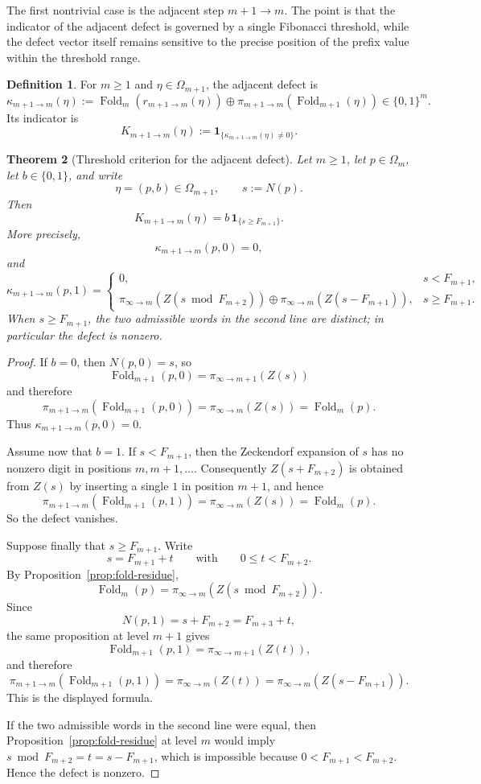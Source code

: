 \documentclass[11pt,reqno]{amsart}
\numberwithin{equation}{section}
\theoremstyle{plain}
\newtheorem{theorem}{Theorem}[section]
\theoremstyle{definition}
\newtheorem{definition}[theorem]{Definition}
\theoremstyle{remark}
\DeclareMathOperator{\Fold}{Fold}
\begin{document}
\noindent
The first nontrivial case is the adjacent step $m+1\to m$.  The point is that
the indicator of the adjacent defect is governed by a single Fibonacci
threshold, while the defect vector itself remains sensitive to the precise
position of the prefix value within the threshold range.

\begin{definition}
\label{def:adjacent-defect}
For $m\ge 1$ and $\eta\in\Omega_{m+1}$, the adjacent defect is
\[
\kappa_{m+1\to m}(\eta)
:=
\Fold_m(r_{m+1\to m}(\eta))
\oplus
\pi_{m+1\to m}(\Fold_{m+1}(\eta))
\in\{0,1\}^m.
\]
Its indicator is
\[
K_{m+1\to m}(\eta):=\mathbf{1}_{\{\kappa_{m+1\to m}(\eta)\ne 0\}}.
\]
\end{definition}

\begin{theorem}[Threshold criterion for the adjacent defect]
\label{thm:adjacent-threshold}
Let $m\ge 1$, let $p\in\Omega_m$, let $b\in\{0,1\}$, and write
\[
\eta=(p,b)\in\Omega_{m+1},
\qquad
s:=N(p).
\]
Then
\[
K_{m+1\to m}(\eta)=b\,\mathbf{1}_{\{s\ge F_{m+1}\}}.
\]
More precisely,
\[
\kappa_{m+1\to m}(p,0)=0,
\]
and
\[
\kappa_{m+1\to m}(p,1)=
\begin{cases}
0,& s<F_{m+1},\\[4pt]
\pi_{\infty\to m}(Z(s\bmod F_{m+2}))
\oplus
\pi_{\infty\to m}(Z(s-F_{m+1})),
& s\ge F_{m+1}.
\end{cases}
\]
When $s\ge F_{m+1}$, the two admissible words in the second line are distinct;
in particular the defect is nonzero.
\end{theorem}

\begin{proof}
If $b=0$, then $N(p,0)=s$, so
\[
\Fold_{m+1}(p,0)=\pi_{\infty\to m+1}(Z(s))
\]
and therefore
\[
\pi_{m+1\to m}(\Fold_{m+1}(p,0))
=
\pi_{\infty\to m}(Z(s))
=
\Fold_m(p).
\]
Thus $\kappa_{m+1\to m}(p,0)=0$.

Assume now that $b=1$.  If $s<F_{m+1}$, then the Zeckendorf expansion of $s$
has no nonzero digit in positions $m,m+1,\dots$.  Consequently
$Z(s+F_{m+2})$ is obtained from $Z(s)$ by inserting a single $1$ in position
$m+1$, and hence
\[
\pi_{m+1\to m}(\Fold_{m+1}(p,1))
=
\pi_{\infty\to m}(Z(s))
=
\Fold_m(p).
\]
So the defect vanishes.

Suppose finally that $s\ge F_{m+1}$.  Write
\[
s=F_{m+1}+t
\qquad\text{with}\qquad
0\le t<F_{m+2}.
\]
By Proposition~\ref{prop:fold-residue},
\[
\Fold_m(p)=\pi_{\infty\to m}(Z(s\bmod F_{m+2})).
\]
Since
\[
N(p,1)=s+F_{m+2}=F_{m+3}+t,
\]
the same proposition at level $m+1$ gives
\[
\Fold_{m+1}(p,1)=\pi_{\infty\to m+1}(Z(t)),
\]
and therefore
\[
\pi_{m+1\to m}(\Fold_{m+1}(p,1))
=
\pi_{\infty\to m}(Z(t))
=
\pi_{\infty\to m}(Z(s-F_{m+1})).
\]
This is the displayed formula.

If the two admissible words in the second line were equal, then
Proposition~\ref{prop:fold-residue} at level $m$ would imply
$s\bmod F_{m+2}=t=s-F_{m+1}$, which is impossible because
$0<F_{m+1}<F_{m+2}$.  Hence the defect is nonzero.
\end{proof}
\end{document}
